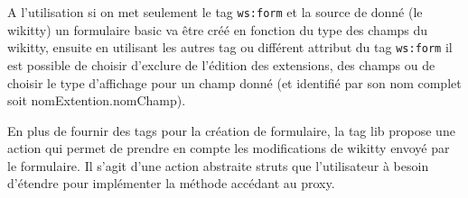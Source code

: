 A l'utilisation si on met seulement le tag \verb!ws:form! et la source de donné 
(le wikitty) un formulaire basic va être créé en fonction du type des champs
du wikitty, ensuite en utilisant les autres tag ou différent attribut du tag 
\verb!ws:form! il est possible de choisir d'exclure de l'édition des extensions,
des champs ou de choisir le type d'affichage pour un champ donné (et identifié
par son nom complet soit nomExtention.nomChamp).

En plus de fournir des tags pour la création de formulaire, la tag lib propose 
une action qui permet de prendre en compte les modifications de wikitty envoyé
par le formulaire. Il s'agit d'une action abstraite struts que l'utilisateur à 
besoin d'étendre pour implémenter la méthode accédant au proxy.







